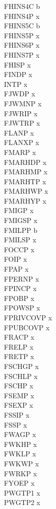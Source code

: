 \documentclass[12pt]{article}
\begin{document}
FHINS4C b\\
FHINS4P x\\
FHINS5C b\\
FHINS5P x\\
FHINS6P x\\
FHINS7P x\\
FHISP x\\
FINDP x\\
INTP x\\
FJWDP x\\
FJWMNP x\\
FJWRIP x\\
FJWTRP x\\
FLANP x\\
FLANXP x\\
FMARP x\\
FMARHDP x\\
FMARHMP x\\
FMARHTP x\\
FMARHWP x\\
FMARHYP x\\
FMIGP x\\
FMIGSP x\\
FMILPP b\\
FMILSP x\\
FOCCP x\\
FOIP x\\
FPAP x\\
FPERNP x\\
FPINCP x\\
FPOBP x\\
FPOWSP x\\
FPRIVCOVP x\\
FPUBCOVP x\\
FRACP x\\
FRELP x\\
FRETP x\\
FSCHGP x\\
FSCHLP x\\
FSCHP x\\
FSEMP x\\
FSEXP x\\
FSSIP x\\
FSSP x\\
FWAGP x\\
FWKHP x\\
FWKLP x\\
FWKWP x\\
FWRKP x\\
FYOEP x\\
PWGTP1 x\\
PWGTP2 x\\
\end{document}
